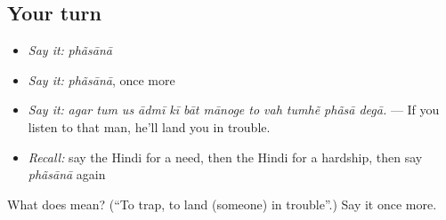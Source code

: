 \subsection*{Your turn}
\begin{itemize}
\raggedright
  \item \emph{Say it:} \emph{phãsānā}
  \item \emph{Say it:} \emph{phãsānā}, once more
  \item \emph{Say it:} \emph{agar tum us ādmī kī bāt mānoge to vah tumhẽ phãsā degā.} — If you listen to that man, he'll land you in trouble.
  \item \emph{Recall:} say the Hindi for a need, then the Hindi for a hardship, then say \emph{phãsānā} again
\end{itemize}

\begin{tcolorbox}[breakable,colback=teal!4,colframe=teal!35!black,title={Before you move on}]
What does  mean? (\textquotedblleft{}To trap, to land (someone) in trouble\textquotedblright{}.) Say it once more.
\end{tcolorbox}
